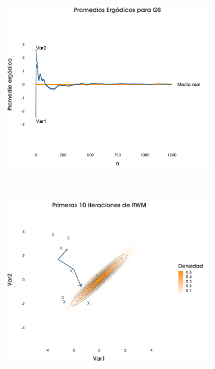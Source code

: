 \begin{figure}[h]
\begin{subfigure}{0.3\textwidth}
        \includegraphics[width=\textwidth]{Figs/Bayes/Ejemplo_GS_Compara3}
    \end{subfigure}
    ~
    \begin{subfigure}{0.3\textwidth}
        \includegraphics[width=\textwidth]{Figs/Bayes/Ejemplo_RWM_Compara2A}
    \end{subfigure}
    ~
    \begin{subfigure}{0.3\textwidth}

\end{subfigure}
\end{figure}
